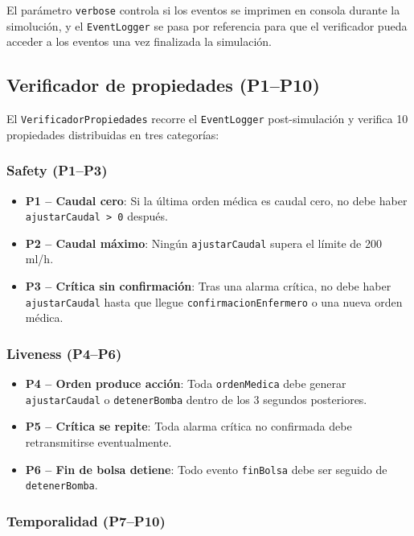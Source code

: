 \documentclass[12pt,a4paper]{article}
\begin{document}
El parámetro \texttt{verbose} controla si los eventos se imprimen
en consola durante la simolución, y el \texttt{EventLogger} se pasa
por referencia para que el verificador pueda acceder a los eventos
una vez finalizada la simulación.

\subsection{Verificador de propiedades (P1--P10)}

El \texttt{VerificadorPropiedades} recorre el \texttt{EventLogger}
post-simulación y verifica 10 propiedades distribuidas en tres
categorías:

\subsubsection*{Safety (P1--P3)}

\begin{itemize}
    \item \textbf{P1 -- Caudal cero}: Si la última orden médica es
    caudal cero, no debe haber \texttt{ajustarCaudal > 0} después.
    \item \textbf{P2 -- Caudal máximo}: Ningún \texttt{ajustarCaudal}
    supera el límite de 200 ml/h.
    \item \textbf{P3 -- Crítica sin confirmación}: Tras una alarma
    crítica, no debe haber \texttt{ajustarCaudal} hasta que llegue
    \texttt{confirmacionEnfermero} o una nueva orden médica.
\end{itemize}

\subsubsection*{Liveness (P4--P6)}

\begin{itemize}
    \item \textbf{P4 -- Orden produce acción}: Toda
    \texttt{ordenMedica} debe generar \texttt{ajustarCaudal} o
    \texttt{detenerBomba} dentro de los 3 segundos posteriores.
    \item \textbf{P5 -- Crítica se repite}: Toda alarma crítica no
    confirmada debe retransmitirse eventualmente.
    \item \textbf{P6 -- Fin de bolsa detiene}: Todo evento
    \texttt{finBolsa} debe ser seguido de \texttt{detenerBomba}.
\end{itemize}

\subsubsection*{Temporalidad (P7--P10)}
\end{document}
